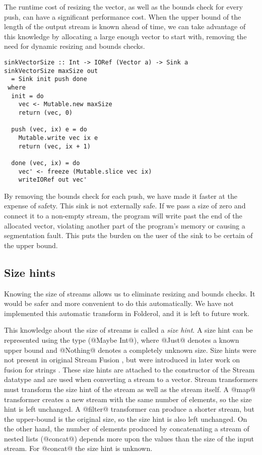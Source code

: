 The runtime cost of resizing the vector, as well as the bounds check for every push, can have a significant performance cost.
When the upper bound of the length of the output stream is known ahead of time, we can take advantage of this knowledge by allocating a large enough vector to start with, removing the need for dynamic resizing and bounds checks.


\begin{lstlisting}
sinkVectorSize :: Int -> IORef (Vector a) -> Sink a
sinkVectorSize maxSize out
  = Sink init push done
 where
  init = do
    vec <- Mutable.new maxSize
    return (vec, 0)

  push (vec, ix) e = do
    Mutable.write vec ix e
    return (vec, ix + 1)

  done (vec, ix) = do
    vec' <- freeze (Mutable.slice vec ix)
    writeIORef out vec'
\end{lstlisting}

By removing the bounds check for each push, we have made it faster at the expense of safety.
This sink is not externally safe.
If we pass a size of zero and connect it to a non-empty stream, the program will write past the end of the allocated vector, violating another part of the program's memory or causing a segmentation fault.
This puts the burden on the user of the sink to be certain of the upper bound.

\subsection{Size hints}
\label{s:implementation:sizehints}


Knowing the size of streams allows us to eliminate resizing and bounds checks.
It would be safer and more convenient to do this automatically.
We have not implemented this automatic transform in Folderol, and it is left to future work.

This knowledge about the size of streams is called a \emph{size hint}.
A size hint can be represented using the type (@Maybe Int@), where @Just@ denotes a known upper bound and @Nothing@ denotes a completely unknown size.
Size hints were not present in original Stream Fusion \cite{coutts2007stream}, but were introduced in later work on fusion for strings \cite{coutts2007rewriting}.
These size hints are attached to the constructor of the Stream datatype and are used when converting a stream to a vector.
Stream transformers must transform the size hint of the stream as well as the stream itself.
A @map@ transformer creates a new stream with the same number of elements, so the size hint is left unchanged.
A @filter@ transformer can produce a shorter stream, but the upper-bound is the original size, so the size hint is also left unchanged.
On the other hand, the number of elements produced by concatenating a stream of nested lists (@concat@) depends more upon the values than the size of the input stream.
For @concat@ the size hint is unknown.

